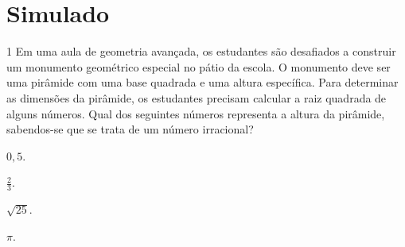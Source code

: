




%




\chapter[Simulado 3]{Simulado}

\num{1} Em uma aula de geometria avançada, os estudantes são desafiados a construir
um monumento geométrico especial no pátio da escola. O monumento deve ser uma
pirâmide com uma base quadrada e uma altura específica. Para determinar as dimensões
da pirâmide, os estudantes precisam calcular a raiz quadrada de alguns números.
Qual dos seguintes números representa a altura da pirâmide, sabendos-se que se trata
de um número irracional?

\begin{escolha}
\item $0,5$.

\item $\frac{2}{3}$.

\item $\sqrt{25}$.

\item $\pi$.
\end{escolha}

